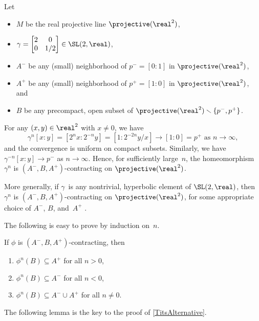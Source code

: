 \begin{eg} \label{22contracts}
 Let 
 \noprelistbreak
 \begin{itemize}
 \item $M$ be the real projective line
$\projective(\real^2)$, 
 \item $\gamma = 
 \begin{bmatrix}
 2 & 0 \\
 0 & 1/2
 \end{bmatrix}
 \in \SL(2,\real)$,
 \item $A^-$ be any (small) neighborhood of $p^- = [0:1]$
in $\projective(\real^2)$,
 \item $A^+$ be any (small) neighborhood of $p^+ = [1:0]$
in $\projective(\real^2)$, and
 \item $B$ be any precompact, open subset of
$\projective(\real^2) \smallsetminus \{p^-,p^+\}$.
 \end{itemize}
 For any $(x,y) \in \real^2$ with $x \neq 0$, we have
  $$\text{$\gamma^n[x:y] = [2^nx:2^{-n}y] = [1:2^{-2n}y/x] \to
[1:0] = p^+$ \  as \ $n \to \infty$} , $$
 and the convergence is uniform on
compact subsets. Similarly, we have $\gamma^{-n}[x:y] \to p^-$ as
$n \to \infty$. Hence, for sufficiently large~$n$, the
homeomorphism $\gamma^n$ is $(A^-,B,A^+)$-contracting
on $\projective(\real^2)$.
 \end{eg}

More generally, if $\gamma$~is any nontrivial, hyperbolic
element of $\SL(2,\real)$, then $\gamma^n$ is
$(A^-,B,A^+)$-contracting on $\projective(\real^2)$, for
some appropriate choice of $A^-$, $B$, and~$A^+$
.

The following is easy to prove by induction on~$n$.

\begin{lem} \label{TitsPhi(A)}
 If $\phi$ is $(A^-,B,A^+)$-contracting, then
 \begin{enumerate}
 \item \label{TitsPhi(A)-A+}
 $\phi^n(B) \subseteq A^+$ for all $n > 0$,
 \item $\phi^n(B) \subseteq A^-$ for all $n < 0$,
 \item \label{TitsPhi(A)-A}
 $\phi^n(B) \subseteq A^- \cup A^+$ for all $n \neq 0$.
 \end{enumerate}
 \end{lem}

The following lemma is the key to the proof of
\cref{TitsAlternative}.

